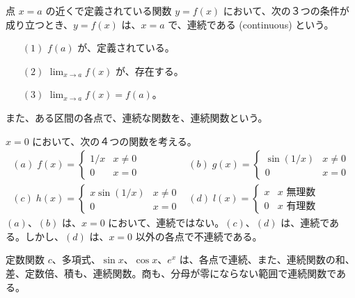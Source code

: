 \setcounter{page}{0}
\maketitle
\newpage
{}
\begin{definition}
点 $x = a$ の近くで定義されている関数 $y = f(x)$ において、次の３つの条件が成り立つとき、$y = f(x)$ は、$x = a$  で、連続である (continuous) という。
\begin{itemize}
\item[$(1)$] $f(a)$ が、定義されている。
\item[$(2)$] ${\displaystyle\lim_{x\rightarrow a}f(x)}$  が、存在する。
\item[$(3)$] ${\displaystyle\lim_{x\rightarrow a}f(x) = f(a)}$。
\end{itemize}
また、ある区間の各点で、連続な関数を、連続関数という。
\end{definition}

\begin{eg}
$x = 0$ において、次の４つの関数を考える。
$$\begin{array}{ll}
(a)\;f(x) = \left\{\begin{array}{ll}1/x & x\neq 0\\ 0 & x = 0 \end{array}\right. &
(b)\;g(x) = \left\{\begin{array}{ll}\sin(1/x)& x\neq 0\\ 0 & x = 0 \end{array}\right.\\
(c)\;h(x) = \left\{\begin{array}{ll}x\sin(1/x) & x\neq 0\\ 0 & x = 0 \end{array}\right. & (d)\;l(x) = \left\{\begin{array}{ll}x & x\mbox{ 無理数}\\ 0 & x\mbox{ 有理数} \end{array}\right.
\end{array}$$
$(a)$、$(b)$ は、$x = 0$ において、連続ではない。$(c)$、$(d)$ は、連続である。しかし、$(d)$ は、$x = 0$ 以外の各点で不連続である。
\end{eg}

\begin{eg}
定数関数 $c$、多項式、$\sin x$、$\cos x$、$e^x$ は、各点で連続、また、連続関数の和、差、定数倍、積も、連続関数。商も、分母が零にならない範囲で連続関数である。
\end{eg}

